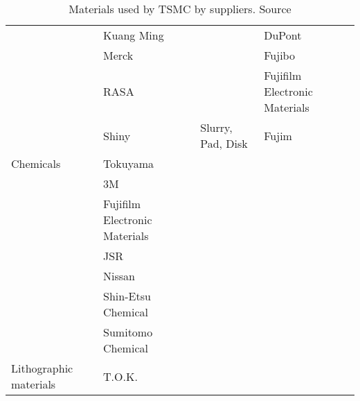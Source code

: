 \begin{table}[H]
\begin{adjustbox}{max width=0.9\textwidth}
\begin{tabular}{@{}llll@{}}
                                         & Kuang Ming                    &                                     & DuPont                        \\
                                         & Merck                         &                                     & Fujibo                        \\
                                         & RASA                          &                                     & Fujifilm Electronic Materials \\
                                         & Shiny                         & \multirow{-7}{*}{Slurry, Pad, Disk} & Fujim                         \\ \cmidrule(l){3-4} 
\multirow{-11}{*}{Chemicals}             & Tokuyama                      &                                     &                               \\ \cmidrule(r){1-2}
                                         & 3M                            &                                     &                               \\
                                         & Fujifilm Electronic Materials &                                     &                               \\
                                         & JSR                           &                                     &                               \\
                                         & Nissan                        &                                     &                               \\
                                         & Shin-Etsu Chemical            &                                     &                               \\
                                         & Sumitomo Chemical             &                                     &                               \\
\multirow{-7}{*}{Lithographic materials} & T.O.K.                        &                                     &                               \\ \cmidrule(r){1-2}
\end{tabular}
\end{adjustbox}
\caption{Materials used by TSMC by suppliers. Source \cite{TSMCAnnualReport}}
\label{tab:tsmc-suppliers}
\end{table}